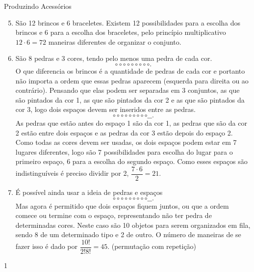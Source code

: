 \begin{answer}{Produzindo Acessórios}
{
\begin{enumerate}\setcounter{enumi}{4}
\item São 12 brincos e 6 braceletes. Existem 12 possibilidades para a escolha dos brincos e 6 para a escolha dos braceletes, pelo princípio multiplicativo $12 \cdot 6 = 72$ maneiras diferentes de organizar o conjunto. 
\item São 8 pedras e 3 cores, tendo pelo menos uma pedra de cada cor. 
$$ \circ \circ \circ \circ \circ \circ \circ \circ \circ .$$
O que diferencia os brincos é a quantidade de pedras de cada cor e portanto não importa a ordem que essas pedras aparecem (esquerda para direita ou ao contrário).
Pensando que elas podem ser separadas em 3 conjuntos, as que são pintados da cor 1, as que são pintados da cor 2 e as que são pintados da cor 3, logo dois espaços devem ser inseridos entre as pedras. 
$$ \circ \circ \circ \circ \circ \circ \circ \circ \circ \_ \_ .$$
As pedras que estão antes do espaço 1 são da cor 1, as pedras que são da cor 2 estão entre dois espaços e as pedras da cor 3 estão depois do espaço 2. Como todas as cores devem ser usadas, os dois espaços podem estar em 7 lugares diferentes, logo são 7 possibilidades para escolha do lugar para o primeiro espaço, 6 para a escolha do segundo espaço. Como esses espaços são indistinguíveis é preciso dividir por 2, $\dfrac{7 \cdot 6}{2}= 21$.
\item É possível ainda usar a ideia de pedras e espaços 
$$ \circ \circ \circ \circ \circ \circ \circ \circ \circ \_ \_ .$$
Mas agora é permitido que dois espaços fiquem juntos, ou que a ordem comece ou termine com o espaço, representando não ter pedra de determinadas cores. 
Neste caso são 10 objetos para serem organizados em fila, sendo 8 de um determinado tipo e 2 de outro. O número de maneiras de se fazer isso é dado por $\dfrac{10!}{2!8!}=45.$ (permutação com repetição)
\end{enumerate}
}{1}
\end{answer}

